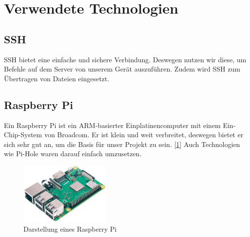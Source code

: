 \documentclass{article}
\begin{document}
\section{Verwendete Technologien}
\subsection{SSH}
SSH bietet eine einfache und sichere Verbindung. Deswegen nutzen wir diese, um Befehle auf dem Server von unserem Gerät auszuführen. Zudem wird SSH zum Übertragen von Dateien eingesetzt.

\subsection{Raspberry Pi}

Ein Raspberry Pi ist ein ARM-basierter Einplatinencomputer mit einem Ein-Chip-System von Broadcom. Er ist klein und weit verbreitet, deswegen bietet er sich sehr gut an, um die Basis für unser Projekt zu sein. [\ref{fig:Raspberry}] Auch Technologien wie Pi-Hole waren darauf einfach umzusetzen. 
\begin{figure}
    \centering
    \includegraphics[width=0.4\textwidth]{assets/RaspberryPi.png}
    \caption[\href{https://cdn-reichelt.de/bilder/web/xxl_ws/A300/RASPBERRY_PI_3B_PLUS_001.png}{Raspberry Pi Darstellung von Reichelt}]{\label{fig:Raspberry}Darstellung eines Raspberry Pi}
\end{figure}
\end{document}
